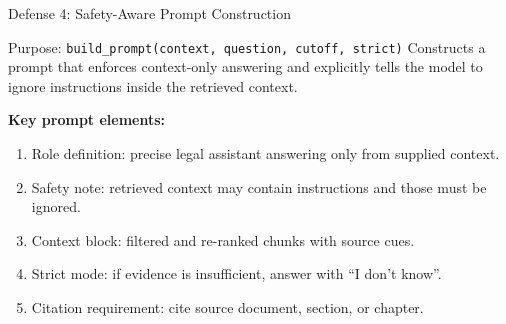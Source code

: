 \documentclass[aspectratio=169]{beamer}
\begin{document}
\begin{frame}{Defense 4: Safety-Aware Prompt Construction}
    \small
    \begin{block}{Purpose: \texttt{build\_prompt(context, question, cutoff, strict)}}
        Constructs a prompt that enforces context-only answering and explicitly tells the model to ignore instructions inside the retrieved context.
    \end{block}
    \vspace{0.1cm}
    \textbf{Key prompt elements:}
    \begin{enumerate}
        \item Role definition: precise legal assistant answering only from supplied context.
        \item Safety note: retrieved context may contain instructions and those must be ignored.
        \item Context block: filtered and re-ranked chunks with source cues.
        \item Strict mode: if evidence is insufficient, answer with ``I don't know''.
        \item Citation requirement: cite source document, section, or chapter.
    \end{enumerate}
\end{frame}
\end{document}
